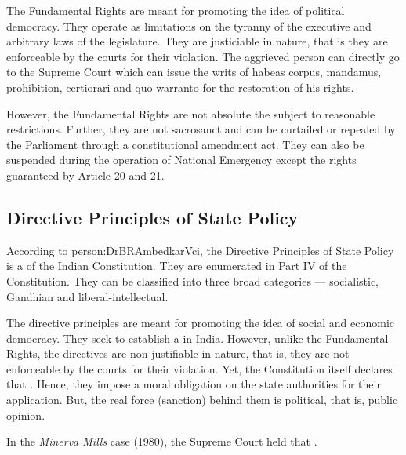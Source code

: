 The Fundamental Rights are meant for promoting the idea of political democracy. They operate as limitations on the tyranny of the executive and arbitrary laws of the legislature. They are justiciable in nature, that is they are enforceable by the courts for their violation. The aggrieved person can directly go to the Supreme Court which can issue the writs of { habeas corpus}, { mandamus}, prohibition, { certiorari} and { quo warranto} for the restoration of his rights.

However, the Fundamental Rights are not absolute the subject to reasonable restrictions. Further, they are not sacrosanct and can be curtailed or repealed by the Parliament through a constitutional amendment act. They can also be suspended during the operation of National Emergency except the rights guaranteed by Article 20 and 21.

\subsection{Directive Principles of State Policy}

According to \gls{person:DrBRAmbedkarVci}, the Directive Principles of State Policy is a  of the Indian Constitution. They are enumerated in Part IV of the Constitution. They can be classified into three broad categories — socialistic, Gandhian and liberal-intellectual.

The directive principles are meant for promoting the idea of social and economic democracy. They seek to establish a  in India. However, unlike the Fundamental Rights, the directives are non-justifiable in nature, that is, they are not enforceable by the courts for their violation. Yet, the Constitution itself declares that . Hence, they impose a moral obligation on the state authorities for their application. But, the real force (sanction) behind them is political, that is, public opinion.

In the { \textit{Minerva Mills}} case (1980), the Supreme Court held that .

